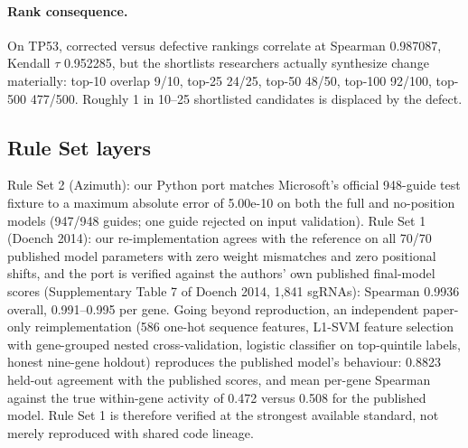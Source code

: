 \paragraph{Rank consequence.} 
On TP53, corrected versus defective rankings correlate at Spearman 0.987087, Kendall $\tau$ 0.952285, but the shortlists researchers actually synthesize change materially: top-10 overlap 9/10, top-25 24/25, top-50 48/50, top-100 92/100, top-500 477/500. Roughly 1 in 10--25 shortlisted candidates is displaced by the defect.
\subsection{Rule Set layers}
Rule Set 2 (Azimuth): our Python port matches Microsoft's official 948-guide test fixture to a maximum absolute error of 5.00e-10 on both the full and no-position models (947/948 guides; one guide rejected on input validation). Rule Set 1 (Doench 2014): our re-implementation agrees with the reference on all 70/70 published model parameters with zero weight mismatches and zero positional shifts, and the port is verified against the authors' own published final-model scores (Supplementary Table 7 of Doench 2014, 1,841 sgRNAs): Spearman 0.9936 overall, 0.991--0.995 per gene. Going beyond reproduction, an independent paper-only reimplementation (586 one-hot sequence features, L1-SVM feature selection with gene-grouped nested cross-validation, logistic classifier on top-quintile labels, honest nine-gene holdout) reproduces the published model's behaviour: 0.8823 held-out agreement with the published scores, and mean per-gene Spearman against the true within-gene activity of 0.472 versus 0.508 for the published model. Rule Set 1 is therefore verified at the strongest available standard, not merely reproduced with shared code lineage.
